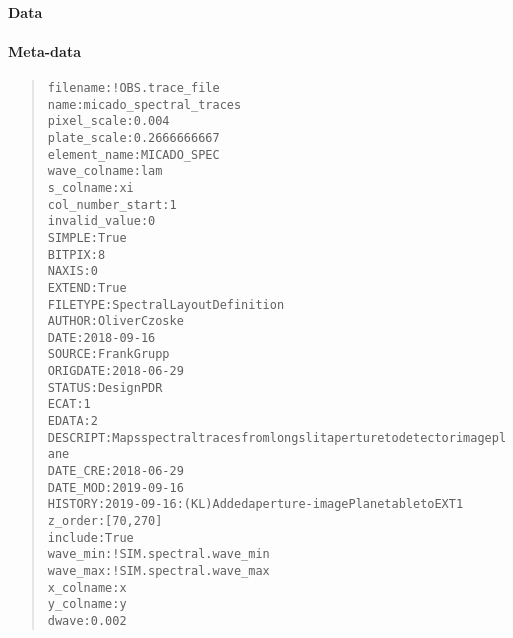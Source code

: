 \paragraph{Data%
  \label{id3}%
}


\paragraph{Meta-data%
  \label{id4}%
}

\begin{quote}
\begin{alltt}
        filename : !OBS.trace_file
            name : micado_spectral_traces
     pixel_scale : 0.004
     plate_scale : 0.2666666667
    element_name : MICADO_SPEC
    wave_colname : lam
       s_colname : xi
col_number_start : 1
   invalid_value : 0
          SIMPLE : True
          BITPIX : 8
           NAXIS : 0
          EXTEND : True
        FILETYPE : Spectral Layout Definition
          AUTHOR : Oliver Czoske
            DATE : 2018-09-16
          SOURCE : Frank Grupp
        ORIGDATE : 2018-06-29
          STATUS : Design PDR
            ECAT : 1
           EDATA : 2
        DESCRIPT : Maps spectral traces from long slit aperture to detector image plane
        DATE_CRE : 2018-06-29
        DATE_MOD : 2019-09-16
         HISTORY : 2019-09-16 : (KL) Added aperture-imagePlane table to EXT 1
         z_order : [70, 270]
         include : True
        wave_min : !SIM.spectral.wave_min
        wave_max : !SIM.spectral.wave_max
       x_colname : x
       y_colname : y
           dwave : 0.002
\end{alltt}
\end{quote}
